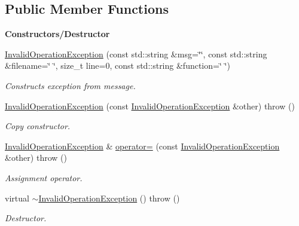 \subsection*{Public Member Functions}
\begin{Indent}{\bf Constructors/\+Destructor}\par
\begin{DoxyCompactItemize}
\item 
\hyperlink{classInvalidOperationException_affce63f9604d0c392946e62eef9917c0}{Invalid\+Operation\+Exception} (const std\+::string \&msg=\char`\"{}\char`\"{}, const std\+::string \&filename=\char`\"{} \char`\"{}, size\+\_\+t line=0, const std\+::string \&function=\char`\"{} \char`\"{})\hypertarget{classInvalidOperationException_affce63f9604d0c392946e62eef9917c0}{}\label{classInvalidOperationException_affce63f9604d0c392946e62eef9917c0}

\begin{DoxyCompactList}\small\item\em Constructs exception from message. \end{DoxyCompactList}\item 
\hyperlink{classInvalidOperationException_ad18f00b8fe7516ab6b8c2028376c0805}{Invalid\+Operation\+Exception} (const \hyperlink{classInvalidOperationException}{Invalid\+Operation\+Exception} \&other)  throw ()\hypertarget{classInvalidOperationException_ad18f00b8fe7516ab6b8c2028376c0805}{}\label{classInvalidOperationException_ad18f00b8fe7516ab6b8c2028376c0805}

\begin{DoxyCompactList}\small\item\em Copy constructor. \end{DoxyCompactList}\item 
\hyperlink{classInvalidOperationException}{Invalid\+Operation\+Exception} \& \hyperlink{classInvalidOperationException_a482ed8869e13ab5db6f5ee67abf05112}{operator=} (const \hyperlink{classInvalidOperationException}{Invalid\+Operation\+Exception} \&other)  throw ()\hypertarget{classInvalidOperationException_a482ed8869e13ab5db6f5ee67abf05112}{}\label{classInvalidOperationException_a482ed8869e13ab5db6f5ee67abf05112}

\begin{DoxyCompactList}\small\item\em Assignment operator. \end{DoxyCompactList}\item 
virtual \hyperlink{classInvalidOperationException_a0047dfc9b947476091ac3ea8bcd8cedf}{$\sim$\+Invalid\+Operation\+Exception} ()  throw ()\hypertarget{classInvalidOperationException_a0047dfc9b947476091ac3ea8bcd8cedf}{}\label{classInvalidOperationException_a0047dfc9b947476091ac3ea8bcd8cedf}

\begin{DoxyCompactList}\small\item\em Destructor. \end{DoxyCompactList}\end{DoxyCompactItemize}
\end{Indent}
